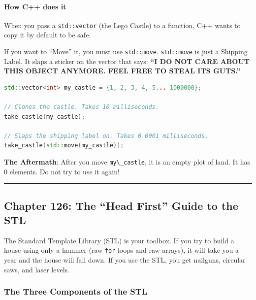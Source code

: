 \hypertarget{how-c-does-it}{%
\paragraph{How C++ does it}\label{how-c-does-it}}

When you pass a \passthrough{\lstinline!std::vector!} (the Lego Castle)
to a function, C++ wants to copy it by default to be safe.

If you want to ``Move'' it, you must use
\passthrough{\lstinline!std::move!}. \passthrough{\lstinline!std::move!}
is just a Shipping Label. It slaps a sticker on the vector that says:
\textbf{``I DO NOT CARE ABOUT THIS OBJECT ANYMORE. FEEL FREE TO STEAL
ITS GUTS.''}

\begin{lstlisting}[language={C++}]
std::vector<int> my_castle = {1, 2, 3, 4, 5... 1000000};

// Clones the castle. Takes 10 milliseconds.
take_castle(my_castle); 

// Slaps the shipping label on. Takes 0.0001 milliseconds.
take_castle(std::move(my_castle)); 
\end{lstlisting}

\textbf{The Aftermath}: After you move
\passthrough{\lstinline!my\_castle!}, it is an empty plot of land. It
has 0 elements. Do not try to use it again!

\begin{center}\rule{0.5\linewidth}{0.5pt}\end{center}

\hypertarget{chapter-126-the-head-first-guide-to-the-stl}{%
\subsection{Chapter 126: The ``Head First'' Guide to the
STL}\label{chapter-126-the-head-first-guide-to-the-stl}}

The Standard Template Library (STL) is your toolbox. If you try to build
a house using only a hammer (raw \passthrough{\lstinline!for!} loops and
raw arrays), it will take you a year and the house will fall down. If
you use the STL, you get nailguns, circular saws, and laser levels.

\hypertarget{the-three-components-of-the-stl}{%
\subsubsection{The Three Components of the
STL}\label{the-three-components-of-the-stl}}

